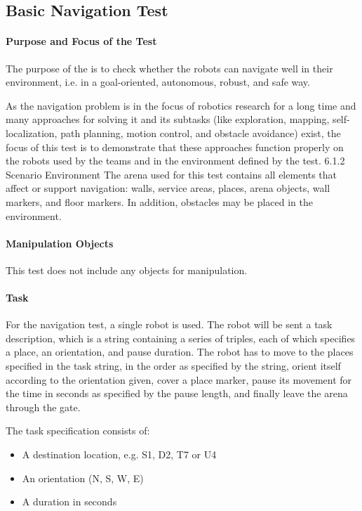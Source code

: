 \subsection{Basic Navigation Test}

\paragraph{Purpose and Focus of the Test}
The purpose of the  is to check whether the robots can navigate well in their environment, i.e. in a goal-oriented, autonomous, robust, and safe way.
\par
As the navigation problem is in the focus of robotics research for a long time and many approaches for solving it and its subtasks (like exploration, mapping, self-localization, path planning, motion control, and obstacle avoidance) exist, the focus of this test is to demonstrate that these approaches function properly on the robots used by the teams and in the environment defined by the test.
6.1.2 Scenario Environment
The arena used for this test contains all elements that affect or support navigation: walls, service areas, places, arena objects, wall markers, and floor markers. In addition, obstacles may be placed in the environment.
\par
\paragraph{Manipulation Objects}
This test does not include any objects for manipulation.
\paragraph{Task}
For the navigation test, a single robot is used. The robot will be sent a task description, which is a string containing a series of triples, each of which specifies a place, an orientation, and pause duration. The robot has to move to the places specified in the task string, in the order as specified by the string, orient itself according to the orientation given, cover a place marker, pause its movement for the time in seconds as specified by the pause length, and finally leave the arena through the gate.

The task specification consists of:

\begin{itemize}
	\item A destination location, e.g. S1, D2, T7 or U4
	\item An orientation (N, S, W, E)
	\item A duration in seconds
\end{itemize}


